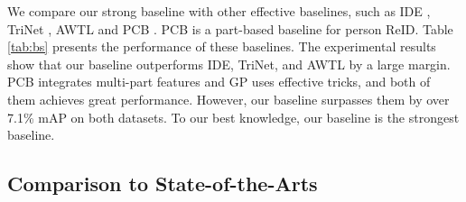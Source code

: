 \documentclass[journal]{IEEEtran}
\begin{document}
We compare our strong baseline with other effective baselines, such as IDE \cite{zheng2018discriminatively}, TriNet \cite{hermans2017defense}, AWTL \cite{ristani2018features} and PCB \cite{sun2018beyond}.
PCB is a part-based baseline for person ReID. Table \ref{tab:bs} presents the performance of these baselines. The experimental results show that our baseline outperforms IDE, TriNet, and AWTL by a large margin. PCB integrates multi-part features and GP uses effective tricks, and both of them achieves great performance. However, our baseline surpasses them by over 7.1\% mAP on both datasets. To our best knowledge, our baseline is the strongest baseline.



\subsection{Comparison to State-of-the-Arts}
\end{document}
